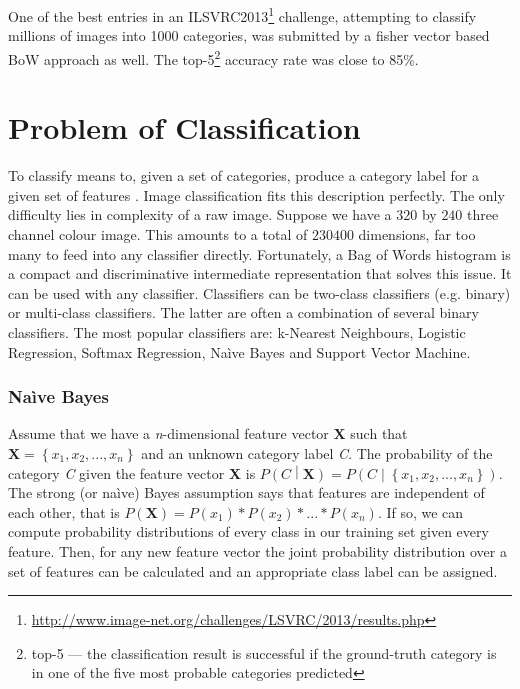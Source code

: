 \documentclass[11pt,twoside]{article}
\begin{document}
    One of the best entries in an ILSVRC2013\footnote{\url{http://www.image-net.org/challenges/LSVRC/2013/results.php}} challenge, attempting to classify millions of images into 1000 categories, was submitted by a fisher vector based BoW approach as well. The top-5\footnote{top-5 --- the classification result is successful if the ground-truth category is in one of the five most probable categories predicted} accuracy rate was close to 85\%.
	      
\section{Problem of Classification}

    To classify means to, given a set of categories, produce a category label for a given set of features \cite{ponce2011cv}. Image classification fits this description perfectly. The only difficulty lies in complexity of a raw image. Suppose we have a $320$ by $240$ three channel colour image. This amounts to a total of $230400$ dimensions, far too many to feed into any classifier directly. Fortunately, a Bag of Words histogram is a compact and discriminative intermediate representation that solves this issue. It can be used with any classifier. Classifiers can be two-class classifiers (e.g. binary) or multi-class classifiers. The latter are often a combination of several binary classifiers. The most popular classifiers are: k-Nearest Neighbours, Logistic Regression, Softmax Regression, Na\`ive Bayes and Support Vector Machine.
    
    \subsubsection{Na\`ive Bayes}
    Assume that we have a \textit{n}-dimensional feature vector $\mathbf{X}$ such that $\mathbf{X} = \left\{x_1, x_2, ... , x_\mathit{n}\right\}$ and an unknown category label \textit{C}. The probability of the category \textit{C} given the feature vector \textbf{X} is $P\left(\mathit{C}\middle|\mathbf{X}\right) = P\left(\mathit{C}\middle|\left\{x_1, x_2, ..., x_\mathit{n}\right\}\right)$. The strong (or na\`ive) Bayes assumption says that features are independent of each other, that is $P(\mathbf{X}) = P(x_1)*P(x_2)*...*P(x_\mathit{n})$. If so, we can compute probability distributions of every class in our training set given every feature. Then, for any new feature vector the joint probability distribution over a set of features can be calculated and an appropriate class label can be assigned.
    
\end{document}
